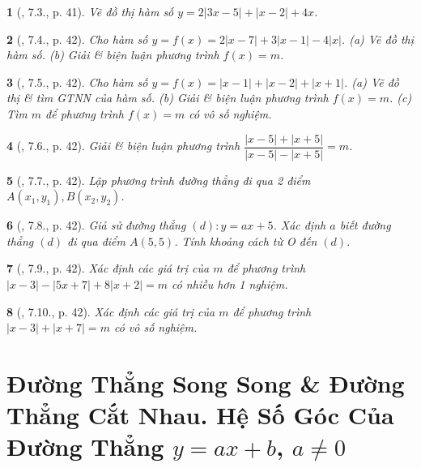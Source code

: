 \documentclass{article}
\newtheorem{baitoan}{}
\begin{document}
\begin{baitoan}[\cite{TLCT_THCS_Toan_9_dai_so}, 7.3., p. 41]
	Vẽ đồ thị hàm số $y = 2|3x - 5| + |x - 2| + 4x$.
\end{baitoan}

\begin{baitoan}[\cite{TLCT_THCS_Toan_9_dai_so}, 7.4., p. 42]
	Cho hàm số $y = f(x) = 2|x - 7| + 3|x - 1| - 4|x|$. (a) Vẽ đồ thị hàm số. (b) Giải \& biện luận phương trình $f(x) = m$. 
\end{baitoan}

\begin{baitoan}[\cite{TLCT_THCS_Toan_9_dai_so}, 7.5., p. 42]
	Cho hàm số $y = f(x) = |x - 1| + |x - 2| + |x + 1|$. (a) Vẽ đồ thị \& tìm {\rm GTNN} của hàm số. (b) Giải \& biện luận phương trình $f(x) = m$. (c) Tìm $m$ để phương trình $f(x) = m$ có vô số nghiệm.
\end{baitoan}

\begin{baitoan}[\cite{TLCT_THCS_Toan_9_dai_so}, 7.6., p. 42]
	Giải \& biện luận phương trình $\dfrac{|x - 5| + |x + 5|}{|x - 5| - |x + 5|} = m$.
\end{baitoan}

\begin{baitoan}[\cite{TLCT_THCS_Toan_9_dai_so}, 7.7., p. 42]
	Lập phương trình đường thẳng đi qua 2 điểm $A(x_1,y_1),B(x_2,y_2)$.
\end{baitoan}

\begin{baitoan}[\cite{TLCT_THCS_Toan_9_dai_so}, 7.8., p. 42]
	Giả sử đường thẳng $(d):y = ax + 5$. Xác định $a$ biết đường thẳng $(d)$ đi qua điểm $A(5,5)$. Tính khoảng cách từ O đến $(d)$.
\end{baitoan}

\begin{baitoan}[\cite{TLCT_THCS_Toan_9_dai_so}, 7.9., p. 42]
	Xác định các giá trị của $m$ để phương trình $|x - 3| - |5x + 7| + 8|x + 2| = m$ có nhiều hơn 1 nghiệm.
\end{baitoan}

\begin{baitoan}[\cite{TLCT_THCS_Toan_9_dai_so}, 7.10., p. 42]
	Xác định các giá trị của $m$ để phương trình $|x - 3| + |x + 7| = m$ có vô số nghiệm.
\end{baitoan}


\section{Đường Thẳng Song Song \& Đường Thẳng Cắt Nhau. Hệ Số Góc Của Đường Thẳng $y = ax + b$, $a\ne0$}
\end{document}
